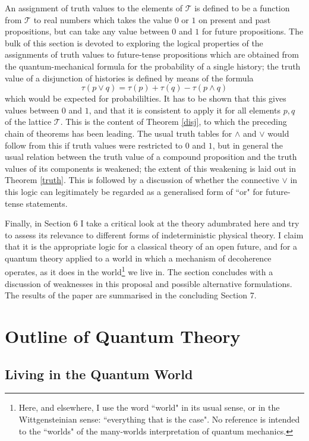 \documentclass[12pt,a4paper,reqno]{article}
\renewcommand{\(}{\left(}
\renewcommand{\)}{\right)}
\newcommand{\T}{\mathcal{T}}
\newcommand{\<}{\langle}
\renewcommand{\>}{\rangle}
\theoremstyle{plain} %
\begin{document}
An assignment of truth values to the elements of $\T$ is defined to be a function from $\T$ to real numbers which takes the value $0$ or $1$ on present and past propositions, but can take any value between $0$ and $1$ for future propositions. The bulk of this section is devoted to exploring the logical properties of the assignments of truth values to future-tense propositions which are obtained from the quantum-mechanical formula for the probability of a single history; the truth value of a disjunction of histories is defined by means of the formula
\[
\tau(p\lor q) = \tau(p) + \tau(q) - \tau(p\land q)
\]
which would be expected for probabililties. It has to be shown that this gives values between $0$ and $1$, and that it is consistent to apply it for all elements $p,q$ of the lattice $\T$. This is the content of Theorem \ref{disj}, to which the preceding chain of theorems has been leading. The usual truth tables for $\land$ and $\lor$ would follow from this if truth values were restricted to $0$ and $1$, but in general the usual relation between the truth value of a compound proposition and the truth values of its components is weakened; the extent of this weakening is laid out in Theorem \ref{truth}. This is followed by a discussion of whether the connective $\lor$ in this logic can legitimately be regarded as a generalised form of ``or" for future-tense statements.

Finally, in Section 6 I take a critical look at the theory adumbrated here and try to assess its relevance to different forms of indeterministic physical theory. I claim that it is the appropriate logic for a classical theory of an open future, and for a quantum theory applied to a world in which a mechanism of decoherence operates, as it does in the world\footnote{Here, and elsewhere, I use the word ``world" in its usual sense, or in the Wittgensteinian sense: ``everything that is the case". No reference is intended to the ``worlds" of the many-worlds interpretation of quantum mechanics.} we live in. The section concludes with a discussion of weaknesses in this proposal and possible alternative formulations. The results of the paper are summarised in the concluding Section 7.

\section{Outline of Quantum Theory}
\label{sec:quantum}

\subsection{Living in the Quantum World}
\label{subsec:qworld}
\end{document}
